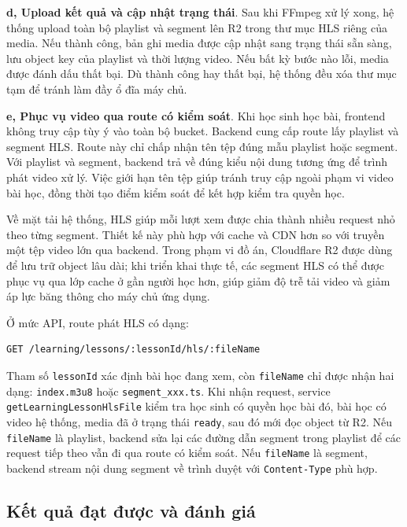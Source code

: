 \documentclass[../DoAn.tex]{subfiles}
\begin{document}
\textbf{d, Upload kết quả và cập nhật trạng thái}. Sau khi FFmpeg xử lý xong, hệ thống upload toàn bộ playlist và segment lên R2 trong thư mục HLS riêng của media. Nếu thành công, bản ghi media được cập nhật sang trạng thái sẵn sàng, lưu object key của playlist và thời lượng video. Nếu bất kỳ bước nào lỗi, media được đánh dấu thất bại. Dù thành công hay thất bại, hệ thống đều xóa thư mục tạm để tránh làm đầy ổ đĩa máy chủ.

\textbf{e, Phục vụ video qua route có kiểm soát}. Khi học sinh học bài, frontend không truy cập tùy ý vào toàn bộ bucket. Backend cung cấp route lấy playlist và segment HLS. Route này chỉ chấp nhận tên tệp đúng mẫu playlist hoặc segment. Với playlist và segment, backend trả về đúng kiểu nội dung tương ứng để trình phát video xử lý. Việc giới hạn tên tệp giúp tránh truy cập ngoài phạm vi video bài học, đồng thời tạo điểm kiểm soát để kết hợp kiểm tra quyền học.

Về mặt tải hệ thống, HLS giúp mỗi lượt xem được chia thành nhiều request nhỏ theo từng segment. Thiết kế này phù hợp với cache và CDN hơn so với truyền một tệp video lớn qua backend. Trong phạm vi đồ án, Cloudflare R2 được dùng để lưu trữ object lâu dài; khi triển khai thực tế, các segment HLS có thể được phục vụ qua lớp cache ở gần người học hơn, giúp giảm độ trễ tải video và giảm áp lực băng thông cho máy chủ ứng dụng.

Ở mức API, route phát HLS có dạng:

\begin{verbatim}
GET /learning/lessons/:lessonId/hls/:fileName
\end{verbatim}

Tham số \texttt{lessonId} xác định bài học đang xem, còn \texttt{fileName} chỉ được nhận hai dạng: \texttt{index.m3u8} hoặc \texttt{segment\_xxx.ts}. Khi nhận request, service \texttt{getLearningLessonHlsFile} kiểm tra học sinh có quyền học bài đó, bài học có video hệ thống, media đã ở trạng thái \texttt{ready}, sau đó mới đọc object từ R2. Nếu \texttt{fileName} là playlist, backend sửa lại các đường dẫn segment trong playlist để các request tiếp theo vẫn đi qua route có kiểm soát. Nếu \texttt{fileName} là segment, backend stream nội dung segment về trình duyệt với \texttt{Content-Type} phù hợp.

\subsection{Kết quả đạt được và đánh giá}
\label{section:5.3.3}
\end{document}
